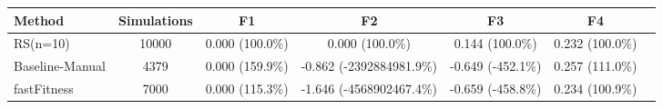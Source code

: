 \begin{tabular}{lcccccc}
\toprule
         Method &  Simulations &              F1 &                       F2 &                F3 &              F4 \\
\midrule
       RS(n=10) &        10000 & 0.000 (100.0\%) &          0.000 (100.0\%) &   0.144 (100.0\%) & 0.232 (100.0\%) \\
Baseline-Manual &         4379 & 0.000 (159.9\%) & -0.862 (-2392884981.9\%) & -0.649 (-452.1\%) & 0.257 (111.0\%) \\
    fastFitness &         7000 & 0.000 (115.3\%) & -1.646 (-4568902467.4\%) & -0.659 (-458.8\%) & 0.234 (100.9\%) \\
\bottomrule
\end{tabular}

